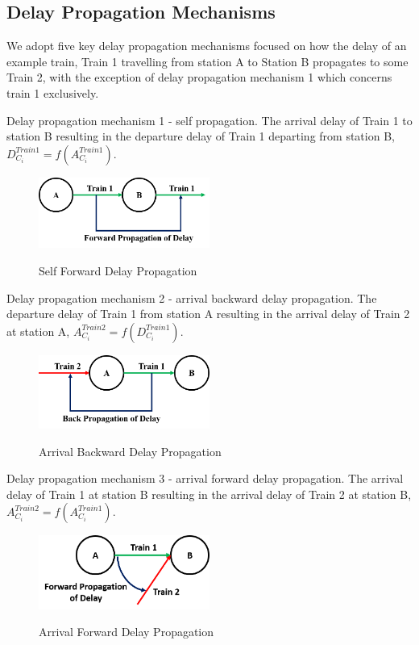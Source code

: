 \documentclass[]{interact}
\theoremstyle{plain}%
\theoremstyle{definition}
\theoremstyle{remark}
\begin{document}
\subsection{Delay Propagation Mechanisms}\label{subsection:delay_propagation_mechanisms}
We adopt five key delay propagation mechanisms focused on how the delay of an example train, Train 1 travelling from station A to Station B propagates to some Train 2, with the exception of delay propagation mechanism 1 which concerns train 1 exclusively.

Delay propagation mechanism 1 - self propagation. The arrival delay of Train 1 to station B resulting in the departure delay of Train 1 departing from station B, $D_{C_i}^{Train 1} = f(A_{C_i}^{Train 1})$.
\begin{figure}[H]
\centering
{%
{\includegraphics[width=0.5\textwidth]{Images/SelfDepartureForwardPropagation.png}}}
\caption{Self Forward Delay Propagation} \label{SelfDepartureForwardPropagation}
\end{figure}

Delay propagation mechanism 2 - arrival backward delay propagation. The departure delay of Train 1 from station A resulting in the arrival delay of Train 2 at station A, $A_{C_i}^{Train 2} = f(D_{C_i}^{Train 1})$.
\begin{figure}[H]
\centering
{%
{\includegraphics[width=0.5\textwidth]{Images/ArrivalBackwardPropagation.png}}}
\caption{Arrival Backward Delay Propagation} \label{ArrivalBackwardPropagation}
\end{figure}

Delay propagation mechanism 3 - arrival forward delay propagation. The arrival delay of Train 1 at station B resulting in the arrival delay of Train 2 at station B, $A_{C_i}^{Train 2} = f(A_{C_i}^{Train 1})$.
\begin{figure}[H]
\centering
{%
{\includegraphics[width=0.5\textwidth]{Images/ArrivalForwardPropagation.png}}}
\caption{Arrival Forward Delay Propagation} \label{ArrivalForwardPropagation}
\end{figure}
\end{document}
